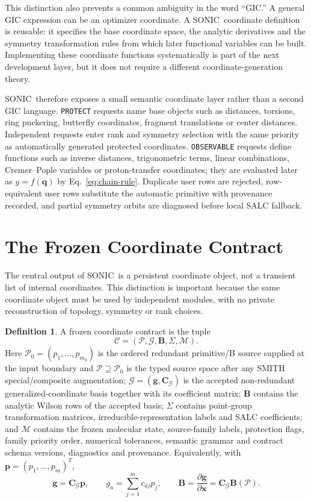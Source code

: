\documentclass[journal=jctcce,manuscript=article,layout=traditional]{achemso}
\newcommand{\SONIC}{SONIC}
\newcommand{\Bmat}{\mathbf{B}}
\newcommand{\Cmat}{\mathbf{C}}
\newcommand{\x}{\mathbf{x}}
\newcommand{\q}{\mathbf{q}}
\theoremstyle{definition}
\newtheorem{definition}{Definition}
\begin{document}
This distinction also prevents a common ambiguity in the word ``GIC.''  A
general GIC expression can be an optimizer coordinate.  A \SONIC\ coordinate
definition is reusable: it specifies the base coordinate
space, the analytic derivatives and the symmetry transformation rules from
which later functional variables can be built.  Implementing these coordinate
functions systematically is part of the next development layer, but it does not
require a different coordinate-generation theory.

\SONIC\ therefore exposes a small semantic coordinate layer rather than a second GIC
language.  \texttt{PROTECT} requests name base objects such as distances,
torsions, ring puckering, butterfly coordinates, fragment translations or
center distances.  Independent requests enter rank and symmetry selection with
the same priority as automatically generated protected coordinates.
\texttt{OBSERVABLE} requests define functions such as inverse distances,
trigonometric terms, linear combinations, Cremer--Pople variables or
proton-transfer coordinates; they are evaluated later as \(y=f(\q)\) by
Eq.~\eqref{eq:chain-rule}.  Duplicate user rows are rejected,
row-equivalent user rows substitute the automatic primitive with provenance
recorded, and partial symmetry orbits are diagnosed before local SALC fallback.

\section{The Frozen Coordinate Contract}

The central output of \SONIC\ is a persistent coordinate object, not a transient
list of internal coordinates.  This distinction is important because the same
coordinate object must be used by independent modules, with no private
reconstruction of topology, symmetry or rank choices.

\begin{definition}
\label{def:frozen-contract}
A frozen coordinate contract is the tuple
\[
  \mathcal{C} = (\mathcal{P},\mathcal{G},\Bmat,\Sigma,\mathcal{M}).
\]
Here \(\mathcal{P}_{0}=(p_1,\ldots,p_{m_0})\) is the ordered redundant
primitive/B source supplied at the input boundary and \(\mathcal{P}\supseteq\mathcal{P}_{0}\)
is the typed source space after any SMITH special/composite augmentation;
\(\mathcal{G}=(\mathbf{g},\Cmat_{\mathcal{G}})\) is the accepted
non-redundant generalized-coordinate basis together with its coefficient
matrix; \(\Bmat\) contains the analytic Wilson rows of the accepted basis;
\(\Sigma\) contains point-group transformation matrices,
irreducible-representation labels and SALC coefficients; and \(\mathcal{M}\)
contains the frozen molecular state, source-family labels, protection flags,
family priority order, numerical tolerances, semantic grammar and contract
schema versions, diagnostics and provenance.
Equivalently, with \(\mathbf{p}=(p_1,\ldots,p_m)^T\),
\[
  \mathbf{g}=\Cmat_{\mathcal{G}}\mathbf{p},
  \qquad
  g_a=\sum_{j=1}^{m} c_{aj}p_j,
  \qquad
  \Bmat=\frac{\partial\mathbf{g}}{\partial\x}
       =\Cmat_{\mathcal{G}}\Bmat(\mathcal{P}).
\]
\end{definition}
\end{document}
